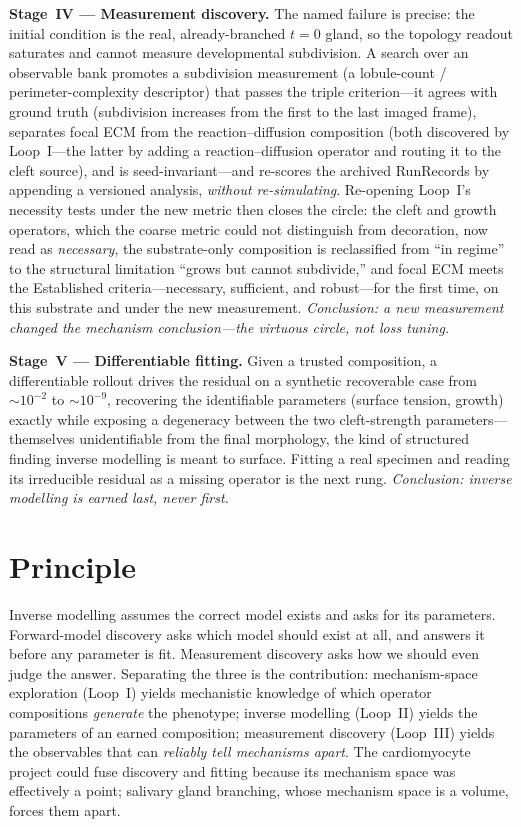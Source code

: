 \documentclass[11pt]{article}
\begin{document}
\textbf{Stage~IV --- Measurement discovery.} The named failure is precise: the initial condition is the real, already-branched $t\!=\!0$ gland, so the topology readout saturates and cannot measure developmental subdivision. A search over an observable bank promotes a subdivision measurement (a lobule-count / perimeter-complexity descriptor) that passes the triple criterion---it agrees with ground truth (subdivision increases from the first to the last imaged frame), separates focal ECM from the reaction--diffusion composition (both discovered by Loop~I---the latter by adding a reaction--diffusion operator and routing it to the cleft source), and is seed-invariant---and re-scores the archived RunRecords by appending a versioned analysis, \emph{without re-simulating}. Re-opening Loop~I's necessity tests under the new metric then closes the circle: the cleft and growth operators, which the coarse metric could not distinguish from decoration, now read as \emph{necessary}, the substrate-only composition is reclassified from ``in regime'' to the structural limitation ``grows but cannot subdivide,'' and focal ECM meets the Established criteria---necessary, sufficient, and robust---for the first time, on this substrate and under the new measurement. \emph{Conclusion: a new measurement changed the mechanism conclusion---the virtuous circle, not loss tuning.}

\textbf{Stage~V --- Differentiable fitting.} Given a trusted composition, a differentiable rollout drives the residual on a synthetic recoverable case from $\sim\!10^{-2}$ to $\sim\!10^{-9}$, recovering the identifiable parameters (surface tension, growth) exactly while exposing a degeneracy between the two cleft-strength parameters---themselves unidentifiable from the final morphology, the kind of structured finding inverse modelling is meant to surface. Fitting a real specimen and reading its irreducible residual as a missing operator is the next rung. \emph{Conclusion: inverse modelling is earned last, never first.}

\section*{Principle}

Inverse modelling assumes the correct model exists and asks for its parameters. Forward-model discovery asks which model should exist at all, and answers it before any parameter is fit. Measurement discovery asks how we should even judge the answer. Separating the three is the contribution: mechanism-space exploration (Loop~I) yields mechanistic knowledge of which operator compositions \emph{generate} the phenotype; inverse modelling (Loop~II) yields the parameters of an earned composition; measurement discovery (Loop~III) yields the observables that can \emph{reliably tell mechanisms apart}. The cardiomyocyte project could fuse discovery and fitting because its mechanism space was effectively a point; salivary gland branching, whose mechanism space is a volume, forces them apart.
\end{document}

